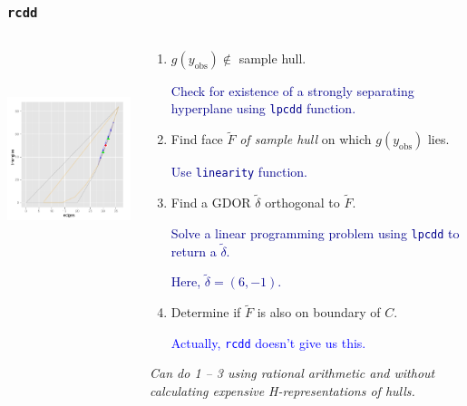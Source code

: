 \documentclass[ 10pt]{beamer}
\newcommand{\yobs}{y_{\text{obs}}}
\begin{document}
\frame
{
\frametitle{\texttt{rcdd}}  

\begin{columns}[]
\begin{column}[T]{0.25\textwidth}
\includegraphics[height=2.5in,trim=3.5in 2in 0.15in 0.05in,clip=true]{MCsample-77face} %
\end{column}

\begin{column}[T]{0.75\textwidth}
\begin{enumerate}
\item $g(\yobs) \notin$ sample hull.  

\textcolor{darkblue}{Check for existence of a strongly separating hyperplane using \texttt{lpcdd} function.}
\vspace{2mm}

\item Find face $\tilde{F}$ \emph{of sample hull} on which $g(\yobs)$ lies.  

\textcolor{darkblue}{Use \texttt{linearity} function.}
\vspace{2mm}

\item Find a GDOR $\tilde{\delta}$ orthogonal to $\tilde{F}$.  

\textcolor{darkblue}{Solve a linear programming problem
using \texttt{lpcdd} to return a $\tilde{\delta}$.  }

\textcolor{darkblue}{Here, $\tilde{\delta} = (6,-1)$.}
\vspace{2mm}

\item Determine if $\tilde{F}$ is also on boundary of $C$.  

\textcolor{blue}{Actually, \texttt{rcdd} doesn't give us this.}  
\end{enumerate}
\vspace{3mm}

\emph{Can do 1 -- 3 using rational arithmetic and without calculating expensive H-representations of hulls.}
\end{column}
\end{columns}
}
\end{document}
